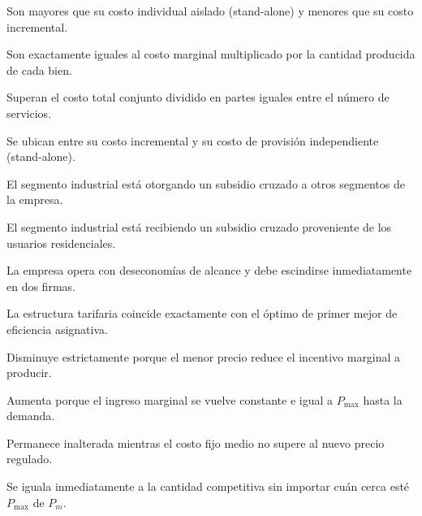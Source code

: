 \begin{opts}
    \item Son mayores que su costo individual aislado (stand-alone) y menores que su costo incremental.
    \item Son exactamente iguales al costo marginal multiplicado por la cantidad producida de cada bien.
    \item Superan el costo total conjunto dividido en partes iguales entre el número de servicios.
    \item Se ubican entre su costo incremental y su costo de provisión independiente (stand-alone).
\end{opts}

\begin{opts}
    \item El segmento industrial está otorgando un subsidio cruzado a otros segmentos de la empresa.
    \item El segmento industrial está recibiendo un subsidio cruzado proveniente de los usuarios residenciales.
    \item La empresa opera con deseconomías de alcance y debe escindirse inmediatamente en dos firmas.
    \item La estructura tarifaria coincide exactamente con el óptimo de primer mejor de eficiencia asignativa.
\end{opts}

\begin{opts}
    \item Disminuye estrictamente porque el menor precio reduce el incentivo marginal a producir.
    \item Aumenta porque el ingreso marginal se vuelve constante e igual a $P_{\max}$ hasta la demanda.
    \item Permanece inalterada mientras el costo fijo medio no supere al nuevo precio regulado.
    \item Se iguala inmediatamente a la cantidad competitiva sin importar cuán cerca esté $P_{\max}$ de $P_m$.
\end{opts}

